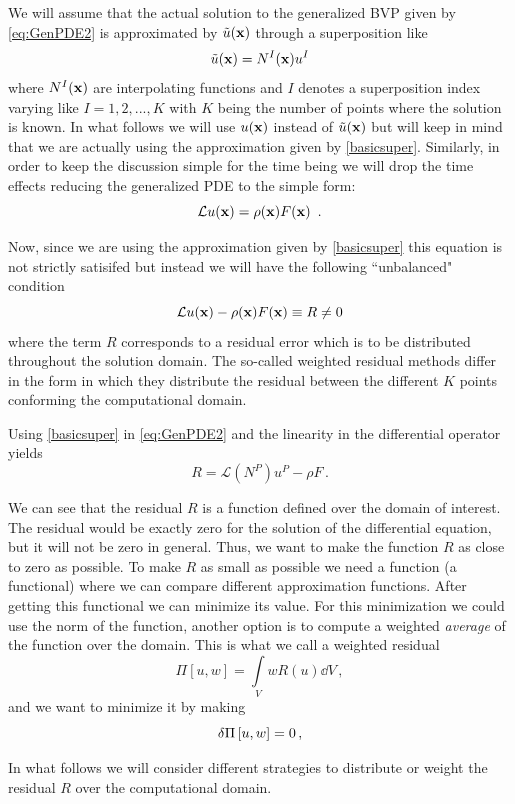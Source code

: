 We will assume that the actual solution to the generalized BVP given by \cref{eq:GenPDE2} is approximated by $\tilde u(\vb{x})$ through a superposition like
\begin{equation}
\tilde u (\vb{x}) = {N^I}(\vb{x}){u^I}
\label{basicsuper}
\end{equation}
where ${N^I}(\vb{x})$ are interpolating functions and $I$ denotes a superposition index  varying like $I=1,2,...,K$ with $K$ being the number of points where the solution is known. In what follows we will use $u(\vb{x})$ instead of $\tilde u (\vb{x})$ but will keep in mind that we are actually using the approximation given by \cref{basicsuper}. Similarly, in order to keep the discussion simple for the time being we will drop the time effects reducing the generalized PDE to the simple form:
\begin{equation}
\mathcal{L}u(\vb x) = \rho (\vb x)F(\vb x) \enspace .
\label{eq:GenPDE3}
\end{equation}

Now, since we are using the approximation given by \cref{basicsuper} this equation is not strictly satisifed but instead we will have the following ``unbalanced" condition
\[\mathcal{L}u(\vb{x}) - \rho (\vb{x})F(\vb{x}) \equiv R \ne 0\]
where the term $R$ corresponds to a residual error which is to be distributed throughout the solution domain. The so-called weighted residual methods differ in the form in which they distribute the residual between the different $K$ points conforming the computational domain.

Using \cref{basicsuper} in \cref{eq:GenPDE2} and the linearity in the differential operator yields
\[R = \mathcal{L}({N^P}){u^P} - \rho F\, .\]

We can see that the residual $R$ is a function defined over the domain of interest. The residual would be exactly zero for the solution of the differential equation, but it will not be zero in general. Thus, we want to make the function $R$ as close to zero as possible. To make $R$ as small as possible we need a function (a functional) where we can compare different approximation functions. After getting this functional we can minimize its value. For this minimization we could use the norm of the function, another option is to compute a weighted \emph{average} of the function over the domain. This is what we call a weighted residual
\[\Pi[u, w] = \int\limits_V w R(u) \dd{V}\, ,\]
and we want to minimize it by making
\[\var{\Pi}[u, w] = 0\, ,\]

In what follows we will consider different strategies to distribute or weight the residual $R$ over the computational domain.

